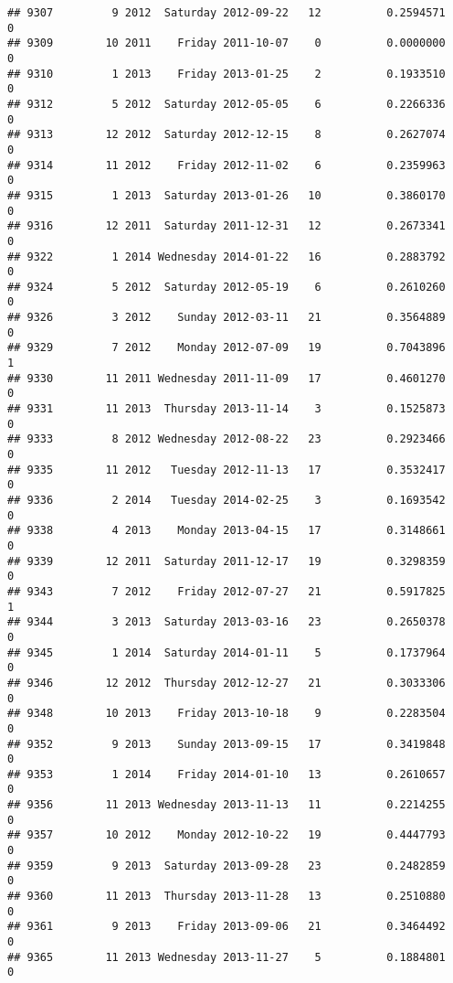 \documentclass[
]{article}
\begin{document}
\begin{verbatim}
## 9307         9 2012  Saturday 2012-09-22   12          0.2594571             0
## 9309        10 2011    Friday 2011-10-07    0          0.0000000             0
## 9310         1 2013    Friday 2013-01-25    2          0.1933510             0
## 9312         5 2012  Saturday 2012-05-05    6          0.2266336             0
## 9313        12 2012  Saturday 2012-12-15    8          0.2627074             0
## 9314        11 2012    Friday 2012-11-02    6          0.2359963             0
## 9315         1 2013  Saturday 2013-01-26   10          0.3860170             0
## 9316        12 2011  Saturday 2011-12-31   12          0.2673341             0
## 9322         1 2014 Wednesday 2014-01-22   16          0.2883792             0
## 9324         5 2012  Saturday 2012-05-19    6          0.2610260             0
## 9326         3 2012    Sunday 2012-03-11   21          0.3564889             0
## 9329         7 2012    Monday 2012-07-09   19          0.7043896             1
## 9330        11 2011 Wednesday 2011-11-09   17          0.4601270             0
## 9331        11 2013  Thursday 2013-11-14    3          0.1525873             0
## 9333         8 2012 Wednesday 2012-08-22   23          0.2923466             0
## 9335        11 2012   Tuesday 2012-11-13   17          0.3532417             0
## 9336         2 2014   Tuesday 2014-02-25    3          0.1693542             0
## 9338         4 2013    Monday 2013-04-15   17          0.3148661             0
## 9339        12 2011  Saturday 2011-12-17   19          0.3298359             0
## 9343         7 2012    Friday 2012-07-27   21          0.5917825             1
## 9344         3 2013  Saturday 2013-03-16   23          0.2650378             0
## 9345         1 2014  Saturday 2014-01-11    5          0.1737964             0
## 9346        12 2012  Thursday 2012-12-27   21          0.3033306             0
## 9348        10 2013    Friday 2013-10-18    9          0.2283504             0
## 9352         9 2013    Sunday 2013-09-15   17          0.3419848             0
## 9353         1 2014    Friday 2014-01-10   13          0.2610657             0
## 9356        11 2013 Wednesday 2013-11-13   11          0.2214255             0
## 9357        10 2012    Monday 2012-10-22   19          0.4447793             0
## 9359         9 2013  Saturday 2013-09-28   23          0.2482859             0
## 9360        11 2013  Thursday 2013-11-28   13          0.2510880             0
## 9361         9 2013    Friday 2013-09-06   21          0.3464492             0
## 9365        11 2013 Wednesday 2013-11-27    5          0.1884801             0

\end{verbatim}
\end{document}
